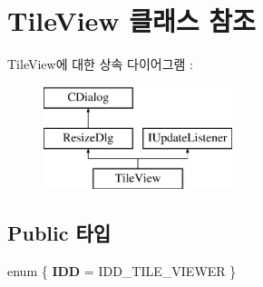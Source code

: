 \hypertarget{class_tile_view}{}\section{Tile\+View 클래스 참조}
\label{class_tile_view}
Tile\+View에 대한 상속 다이어그램 \+: \begin{figure}[H]
\begin{center}
\leavevmode
\includegraphics[height=3.000000cm]{class_tile_view}
\end{center}
\end{figure}
\subsection*{Public 타입}
\begin{DoxyCompactItemize}
\item 
\mbox{\label{class_tile_view_a845736b4060c250e1714163c078d1bc3}} 
enum \{ {\bfseries I\+DD} = I\+D\+D\+\_\+\+T\+I\+L\+E\+\_\+\+V\+I\+E\+W\+ER
 \}
\end{DoxyCompactItemize}
